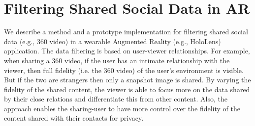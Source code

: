 \section{Filtering Shared Social Data in AR}






We describe a method and a prototype implementation for filtering shared social data (e.g., 360 video) in a wearable Augmented Reality (e.g., HoloLens) application. The data filtering is based on user-viewer relationships. For example, when sharing a 360 video, if the user has an intimate relationship with the viewer, then full fidelity (i.e. the 360 video) of the user's environment is visible. But if the two are strangers then only a snapshot image is shared. By varying the fidelity of the shared content, the viewer is able to focus more on the data shared by their close relations and differentiate this from other content. Also, the approach enables the sharing-user to have more control over the fidelity of the content shared with their contacts for privacy.




